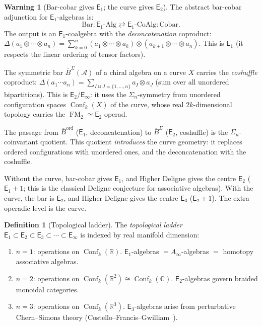\documentclass[11pt,reqno]{amsart}
\theoremstyle{definition}
\newtheorem{definition}[theorem]{Definition}
\newtheorem{warning}[theorem]{Warning}
\theoremstyle{remark}
\newcommand{\cA}{\mathcal{A}}
\newcommand{\Ainf}{A_{\infty}}
\newcommand{\Eone}{\mathsf{E}_{1}}
\newcommand{\Etwo}{\mathsf{E}_{2}}
\newcommand{\Ethree}{\mathsf{E}_{3}}
\newcommand{\Einf}{\mathsf{E}_{\infty}}
\DeclareMathOperator{\Conf}{Conf}
\DeclareMathOperator{\FM}{FM}
\newcommand{\Barord}{\overline{B}^{\mathrm{ord}}}
\newcommand{\BarSig}{\overline{B}^{\Sigma}}
\newcommand{\CC}{\mathbb{C}}
\newcommand{\RR}{\mathbb{R}}
\numberwithin{equation}{section}
\begin{document}
\begin{warning}[Bar-cobar gives $\Eone$; the curve gives $\Etwo$]
\label{warn:e1-vs-e2-source}
The abstract bar-cobar adjunction for $\Eone$-algebras is:
\[
\mathrm{Bar} \colon \Eone\text{-}\mathrm{Alg}
\rightleftarrows
\Eone\text{-}\mathrm{CoAlg}
\colon \mathrm{Cobar}.
\]
The output is an $\Eone$-coalgebra with the
\emph{deconcatenation} coproduct:
$\Delta(a_1 \otimes \cdots \otimes a_n)
= \sum_{k=0}^{n} (a_1 \otimes \cdots \otimes a_k)
\otimes (a_{k+1} \otimes \cdots \otimes a_n)$.
This is $\Eone$ \textup{(}it respects the linear
ordering of tensor factors\textup{)}.

The symmetric bar $\BarSig(\cA)$ of a chiral algebra
on a curve $X$ carries the \emph{coshuffle} coproduct:
$\Delta(a_1 \cdots a_n)
= \sum_{I \sqcup J = \{1,\ldots,n\}} a_I \otimes a_J$
\textup{(}sum over all unordered bipartitions\textup{)}.
This is $\Etwo$/$\Einf$: it uses the
$\Sigma_n$-symmetry from unordered configuration spaces
$\Conf_k(X)$ of the curve, whose real $2k$-dimensional
topology carries the $\FM_2 \simeq \Etwo$ operad.

The passage from $\Barord$ \textup{(}$\Eone$,
deconcatenation\textup{)} to $\BarSig$
\textup{(}$\Etwo$, coshuffle\textup{)} is the
$\Sigma_n$-coinvariant quotient. This quotient
\emph{introduces} the curve geometry: it replaces
ordered configurations with unordered ones, and
the deconcatenation with the coshuffle.

Without the curve, bar-cobar gives $\Eone$, and
Higher Deligne gives the centre $\Etwo$
\textup{(}$\Eone + 1$; this is the classical Deligne
conjecture for associative algebras\textup{)}.
With the curve, the bar is $\Etwo$, and
Higher Deligne gives the centre $\Ethree$
\textup{(}$\Etwo + 1$\textup{)}.
The extra operadic level is the curve.
\end{warning}

\begin{definition}[Topological ladder]
\label{def:top-ladder}
The \emph{topological ladder}
$\Eone \subset \Etwo \subset \Ethree \subset \cdots
 \subset \Einf$
is indexed by real manifold dimension:
\begin{enumerate}[label=\textup{(\roman*)}]
\item $n = 1$: operations on $\Conf_k(\RR)$.
  $\Eone$-algebras $= \Ainf$-algebras $=$ homotopy
  associative algebras.
\item $n = 2$: operations on
  $\Conf_k(\RR^2) \cong \Conf_k(\CC)$.
  $\Etwo$-algebras govern braided monoidal categories.
\item $n = 3$: operations on $\Conf_k(\RR^3)$.
  $\Ethree$-algebras arise from perturbative Chern--Simons
  theory (Costello--Francis--Gwilliam~\cite{CFG26}).
\end{enumerate}
\end{definition}
\end{document}
